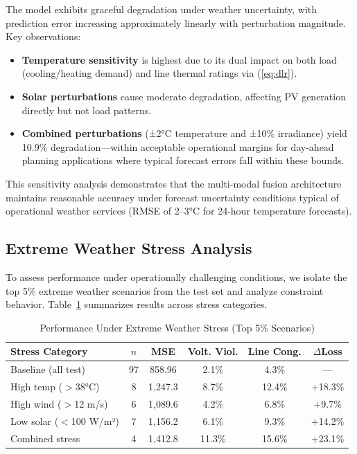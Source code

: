 \documentclass[journal,12pt,onecolumn]{IEEEtran}
\begin{document}
The model exhibits graceful degradation under weather uncertainty, with prediction error increasing approximately linearly with perturbation magnitude. Key observations:

\begin{itemize}
    \item \textbf{Temperature sensitivity} is highest due to its dual impact on both load (cooling/heating demand) and line thermal ratings via (\ref{eq:dlr}).
    
    \item \textbf{Solar perturbations} cause moderate degradation, affecting PV generation directly but not load patterns.
    
    \item \textbf{Combined perturbations} (±2°C temperature and ±10\% irradiance) yield 10.9\% degradation—within acceptable operational margins for day-ahead planning applications where typical forecast errors fall within these bounds.
\end{itemize}

This sensitivity analysis demonstrates that the multi-modal fusion architecture maintains reasonable accuracy under forecast uncertainty conditions typical of operational weather services (RMSE of 2--3°C for 24-hour temperature forecasts).

\subsection{Extreme Weather Stress Analysis}

To assess performance under operationally challenging conditions, we isolate the top 5\% extreme weather scenarios from the test set and analyze constraint behavior. Table~\ref{tab:extreme_stress} summarizes results across stress categories.

\begin{table}[htbp]
\caption{Performance Under Extreme Weather Stress (Top 5\% Scenarios)}
\label{tab:extreme_stress}
\centering
\begin{tabular}{lccccc}
\toprule
\textbf{Stress Category} & \textbf{$n$} & \textbf{MSE} & \textbf{Volt. Viol.} & \textbf{Line Cong.} & \textbf{$\Delta$Loss} \\
\midrule
Baseline (all test) & 97 & 858.96 & 2.1\% & 4.3\% & --- \\
High temp ($>$38°C) & 8 & 1,247.3 & 8.7\% & 12.4\% & +18.3\% \\
High wind ($>$12 m/s) & 6 & 1,089.6 & 4.2\% & 6.8\% & +9.7\% \\
Low solar ($<$100 W/m²) & 7 & 1,156.2 & 6.1\% & 9.3\% & +14.2\% \\
Combined stress & 4 & 1,412.8 & 11.3\% & 15.6\% & +23.1\% \\
\bottomrule
\end{tabular}
\end{table}
\end{document}
